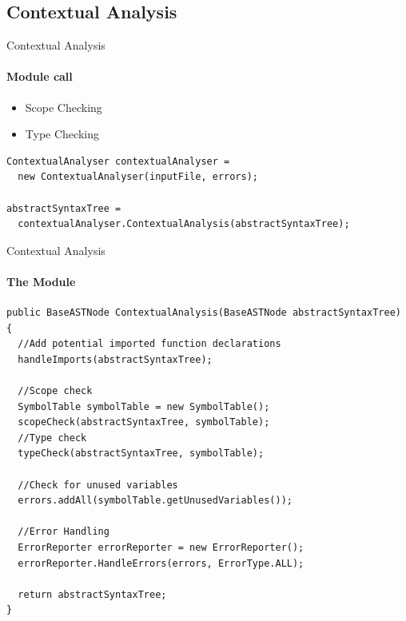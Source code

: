 \subsection{Contextual Analysis}
\begin{frame}[fragile,t]{Contextual Analysis}
\framesubtitle{Module call}
\begin{itemize}
  \item Scope Checking
  \item Type Checking
\end{itemize}
\begin{lstlisting}[caption=The creation of an instance of the Contextual analysis module and the call invoking it. ,frame=tlrb, basicstyle=\tiny, numbers=none]
ContextualAnalyser contextualAnalyser = 
  new ContextualAnalyser(inputFile, errors);

abstractSyntaxTree = 
  contextualAnalyser.ContextualAnalysis(abstractSyntaxTree);
\end{lstlisting}


\end{frame}
\begin{frame}[fragile,t]{Contextual Analysis}

\framesubtitle{The Module}

\begin{lstlisting}[caption=The method called from main performing Scope and Type checking and also reporting errors. ,frame=tlrb, basicstyle=\tiny, numbers=none ]
public BaseASTNode ContextualAnalysis(BaseASTNode abstractSyntaxTree) {
  //Add potential imported function declarations
  handleImports(abstractSyntaxTree);

  //Scope check
  SymbolTable symbolTable = new SymbolTable();
  scopeCheck(abstractSyntaxTree, symbolTable);
  //Type check
  typeCheck(abstractSyntaxTree, symbolTable);

  //Check for unused variables
  errors.addAll(symbolTable.getUnusedVariables());

  //Error Handling
  ErrorReporter errorReporter = new ErrorReporter();
  errorReporter.HandleErrors(errors, ErrorType.ALL);

  return abstractSyntaxTree;
}
\end{lstlisting}
\end{frame}

